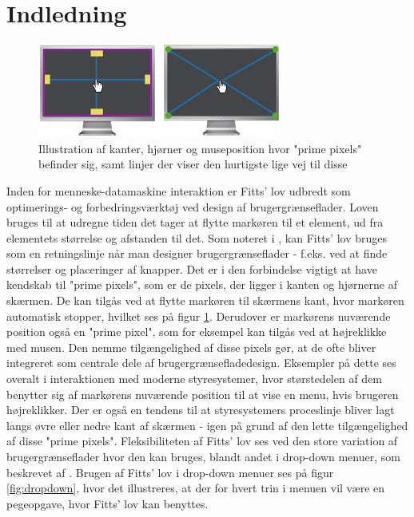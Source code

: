 \chapter*{Indledning}

\begin{figure}
	\centering
	\includegraphics[width=\linewidth]{images/illustrations/prime_pixels}
	\caption{Illustration af kanter, hjørner og museposition hvor "prime pixels" befinder sig, samt linjer der viser den hurtigste lige vej til disse}
	\label{fig:primepixels}
\end{figure}

Inden for menneske-datamaskine interaktion er Fitts' lov udbredt som optimerings- og forbedringsværktøj ved design af brugergrænseflader. Loven bruges til at udregne tiden det tager at flytte markøren til et element, ud fra elementets størrelse og afstanden til det. Som noteret i \cite{karafillis2012}, kan Fitts' lov bruges som en retningslinje når man designer brugergrænseflader - f.eks. ved at finde størrelser og placeringer af knapper. Det er i den forbindelse vigtigt at have kendskab til "prime pixels", som er de pixels, der ligger i kanten og hjørnerne af skærmen. De kan tilgås ved at flytte markøren til skærmens kant, hvor markøren automatisk stopper, hvilket ses på figur \ref{fig:primepixels}. Derudover er markørens nuværende position også en "prime pixel", som for eksempel kan tilgås ved at højreklikke med musen. Den nemme tilgængelighed af disse pixels gør, at de ofte bliver integreret som centrale dele af brugergrænsefladedesign. Eksempler på dette ses overalt i interaktionen med moderne styresystemer, hvor størstedelen af dem benytter sig af markørens nuværende position til at vise en menu, hvis brugeren højreklikker. Der er også en tendens til at styresystemers proceslinje bliver lagt langs øvre eller nedre kant af skærmen - igen på grund af den lette tilgængelighed af disse "prime pixels". Fleksibiliteten af Fitts' lov ses ved den store variation af brugergrænseflader hvor den kan bruges, blandt andet i drop-down menuer, som beskrevet af \cite{accot1997}. Brugen af Fitts' lov i drop-down menuer ses på figur \ref{fig:dropdown}, hvor det illustreres, at der for hvert trin i menuen vil være en pegeopgave, hvor Fitts' lov kan benyttes.\\


